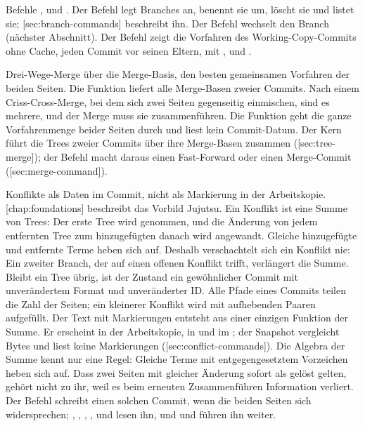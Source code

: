 \startitemize
\item Befehle ,  und .
Der Befehl  legt Branches an, benennt sie um, löscht sie und listet sie;
[sec:branch-commands] beschreibt ihn.
Der Befehl  wechselt den Branch (nächster Abschnitt).
Der Befehl  zeigt die Vorfahren des Working-Copy-Commits ohne Cache,
jeden Commit vor seinen Eltern, mit ,  und .
\item Drei-Wege-Merge über die Merge-Basis, den besten gemeinsamen Vorfahren der beiden Seiten.
Die Funktion  liefert alle Merge-Basen zweier Commits.
Nach einem Criss-Cross-Merge, bei dem sich zwei Seiten gegenseitig einmischen,
sind es mehrere, und der Merge muss sie zusammenführen.
Die Funktion geht die ganze Vorfahrenmenge beider Seiten durch und liest kein Commit-Datum.
Der Kern führt die Trees zweier Commits über ihre Merge-Basen zusammen
([sec:tree-merge]); der Befehl  macht daraus einen Fast-Forward
oder einen Merge-Commit ([sec:merge-command]).
\item Konflikte als Daten im Commit, nicht als Markierung in der Arbeitskopie.
[chap:foundations] beschreibt das Vorbild Jujutsu.
Ein Konflikt ist eine Summe von Trees: Der erste Tree wird genommen, und die Änderung von jedem
entfernten Tree zum hinzugefügten danach wird angewandt.
Gleiche hinzugefügte und entfernte Terme heben sich auf.
Deshalb verschachtelt sich ein Konflikt nie: Ein zweiter Branch, der auf einen offenen Konflikt
trifft, verlängert die Summe.
Bleibt ein Tree übrig, ist der Zustand ein gewöhnlicher Commit mit unverändertem Format und
unveränderter ID.
Alle Pfade eines Commits teilen die Zahl der Seiten; ein kleinerer Konflikt wird mit
aufhebenden Paaren aufgefüllt.
Der Text mit Markierungen entsteht aus einer einzigen Funktion der Summe.
Er erscheint in der Arbeitskopie, in  und im ;
der Snapshot vergleicht Bytes und
liest keine Markierungen ([sec:conflict-commands]).
Die Algebra der Summe kennt nur eine Regel: Gleiche Terme mit entgegengesetztem Vorzeichen heben
sich auf. Dass zwei Seiten mit gleicher Änderung sofort als gelöst gelten, gehört nicht zu ihr,
weil es beim erneuten Zusammenführen Information verliert.
Der Befehl  schreibt einen solchen Commit, wenn die beiden Seiten sich widersprechen;
, , , ,  und 
lesen ihn, und  und  führen ihn weiter.
